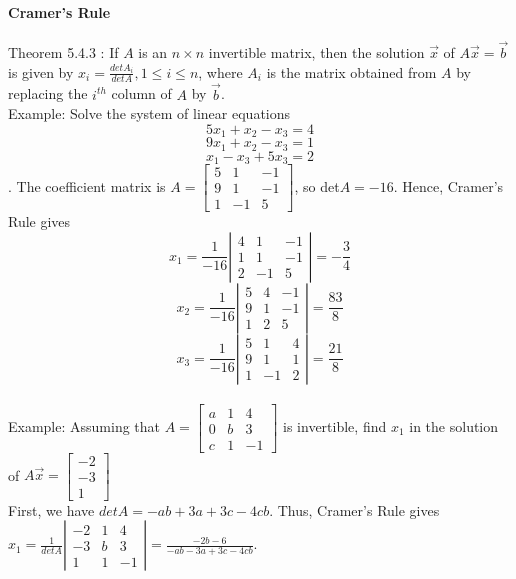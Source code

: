 \documentclass[10pt,letter]{article}
\begin{document}
\paragraph{Cramer's Rule} Theorem 5.4.3 : If $A$ is an $n\times n$ invertible matrix, then the solution $\vec{x}$ of $A\vec{x}=\vec{b}$ is given by $x_i=\frac{detA_i}{detA},1\leq i\leq n$, where $A_i$ is the matrix obtained from $A$ by replacing the $i^{th}$ column of $A$ by $\vec{b}$. \\ 
Example: Solve the system of linear equations $$5x_1+x_2-x_3=4$$ $$9x_1+x_2-x_3=1$$ $$x_1-x_3+5x_3=2$$. The coefficient matrix is $A=\begin{bmatrix}5&1&-1\\9&1&-1\\1&-1&5\end{bmatrix}$, so det$A=-16$. Hence, Cramer's Rule gives $$x_1=\frac{1}{-16}\left|\begin{matrix}4&1&-1\\1&1&-1\\2&-1&5\end{matrix}\right|=-\frac{3}{4}$$ $$x_2=\frac{1}{-16}\left|\begin{matrix}5&4&-1\\9&1&-1\\1&2&5\end{matrix}\right|=\frac{83}{8}$$ $$x_3=\frac{1}{-16}\left|\begin{matrix}5&1&4\\9&1&1\\1&-1&2\end{matrix}\right|=\frac{21}{8}$$ \\ 
Example: Assuming that $A=\begin{bmatrix}a&1&4\\0&b&3\\c&1&-1\end{bmatrix}$ is invertible, find $x_1$ in the solution of $A\vec{x}=\begin{bmatrix}-2\\-3\\1\end{bmatrix}$ \\ 
First, we have $detA=-ab+3a+3c-4cb$. Thus, Cramer's Rule gives $x_1=\frac{1}{detA}\left|\begin{matrix}-2&1&4\\-3&b&3\\1&1&-1\end{matrix}\right|=\frac{-2b-6}{-ab-3a+3c-4cb}$. 
\end{document}
